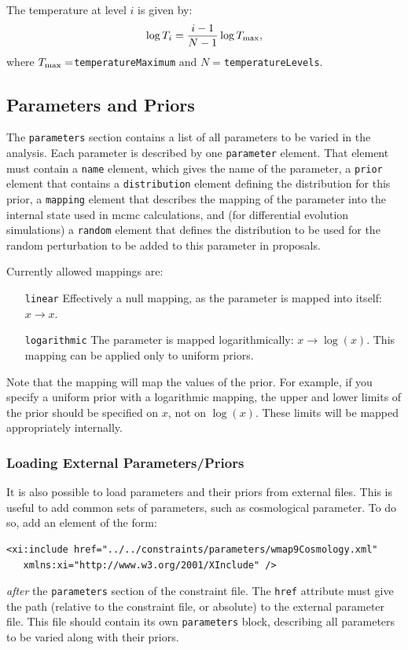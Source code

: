 The temperature at level $i$ is given by:
\begin{equation}
\log T_i = {i-1 \over N-1} \log T_{\rm max},
\end{equation}
where $T_{\rm max}=${\tt temperatureMaximum} and $N=${\tt temperatureLevels}.

\subsection{Parameters and Priors}\label{sec:ParametersPriors}

The {\tt parameters} section contains a list of all parameters to be varied in the analysis. Each parameter is described by one {\tt parameter} element. That element must contain a {\tt name} element, which gives the name of the parameter, a {\tt prior} element that contains a {\tt distribution} element defining the distribution for this prior, a {\tt mapping} element that describes the mapping of the parameter into the internal state used in \gls{mcmc} calculations, and (for differential evolution simulations) a {\tt random} element that defines the distribution to be used for the random perturbation to be added to this parameter in proposals.

Currently allowed mappings are:
\begin{itemize}
\item[{\tt linear}] Effectively a null mapping, as the parameter is mapped into itself: $x \rightarrow x$.
\item[{\tt logarithmic}] The parameter is mapped logarithmically: $x \rightarrow \log(x)$. This mapping can be applied only to uniform priors.
\end{itemize}
Note that the mapping will map the values of the prior. For example, if you specify a uniform prior with a logarithmic mapping, the upper and lower limits of the prior should be specified on $x$, not on $\log(x)$. These limits will be mapped appropriately internally.

\subsubsection{Loading External Parameters/Priors}

It is also possible to load parameters and their priors from external files. This is useful to add common sets of parameters, such as cosmological parameter. To do so, add an element of the form:
\begin{verbatim}
<xi:include href="../../constraints/parameters/wmap9Cosmology.xml" 
   xmlns:xi="http://www.w3.org/2001/XInclude" />
\end{verbatim}
\emph{after} the {\tt parameters} section of the constraint file. The {\tt href} attribute must give the path (relative to the constraint file, or absolute) to the external parameter file. This file should contain its own {\tt parameters} block, describing all parameters to be varied along with their priors. 

